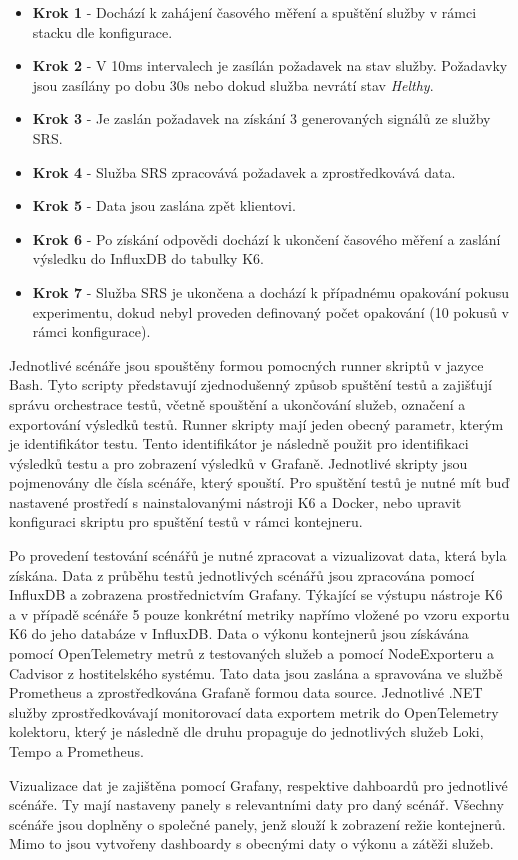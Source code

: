 \begin{itemize}
    \item \textbf{Krok 1} - Dochází k zahájení časového měření a spuštění služby v rámci stacku dle konfigurace.
    \item \textbf{Krok 2} - V 10ms intervalech je zasílán požadavek na stav služby. Požadavky jsou zasílány po dobu 30s nebo dokud služba nevrátí stav \emph{Helthy}.
    \item \textbf{Krok 3} - Je zaslán požadavek na získání 3 generovaných signálů ze služby SRS.
    \item \textbf{Krok 4} - Služba SRS zpracovává požadavek a zprostředkovává data.
    \item \textbf{Krok 5} - Data jsou zaslána zpět klientovi.
    \item \textbf{Krok 6} - Po získání odpovědi dochází k ukončení časového měření a zaslání výsledku do InfluxDB do tabulky K6. 
    \item \textbf{Krok 7} - Služba SRS je ukončena a dochází k případnému opakování pokusu experimentu, dokud nebyl proveden definovaný počet opakování (10 pokusů v rámci konfigurace).
\end{itemize}


Jednotlivé scénáře jsou spouštěny formou pomocných runner skriptů v jazyce Bash. Tyto scripty představují zjednodušenný způsob spuštění testů a zajišťují správu orchestrace testů, včetně spouštění a ukončování služeb, označení a exportování výsledků testů. Runner skripty mají jeden obecný parametr, kterým je identifikátor testu. Tento identifikátor je následně použit pro identifikaci výsledků testu a pro zobrazení výsledků v Grafaně. Jednotlivé skripty jsou pojmenovány dle čísla scénáře, který spouští. Pro spuštění testů je nutné mít buď nastavené prostředí s nainstalovanými nástroji K6 a Docker, nebo upravit konfiguraci skriptu pro spuštění testů v rámci kontejneru.


Po provedení testování scénářů je nutné zpracovat a vizualizovat data, která byla získána. Data z průběhu testů jednotlivých scénářů jsou zpracována pomocí InfluxDB a zobrazena prostřednictvím Grafany. Týkající se výstupu nástroje K6 a v případě scénáře 5 pouze konkrétní metriky napřímo vložené po vzoru exportu K6 do jeho databáze v InfluxDB. Data o výkonu kontejnerů jsou získávána pomocí OpenTelemetry metrů z testovaných služeb a pomocí NodeExporteru a Cadvisor z hostitelského systému. Tato data jsou zaslána a spravována ve službě Prometheus a zprostředkována Grafaně formou data source. Jednotlivé .NET služby zprostředkovávají monitorovací data exportem metrik do OpenTelemetry kolektoru, který je následně dle druhu propaguje do jednotlivých služeb Loki, Tempo a Prometheus.

Vizualizace dat je zajištěna pomocí Grafany, respektive dahboardů pro jednotlivé scénáře. Ty mají nastaveny panely s relevantními daty pro daný scénář. Všechny scénáře jsou doplněny o společné panely, jenž slouží k zobrazení režie kontejnerů. Mimo to jsou vytvořeny dashboardy s obecnými daty o výkonu a zátěži služeb.
